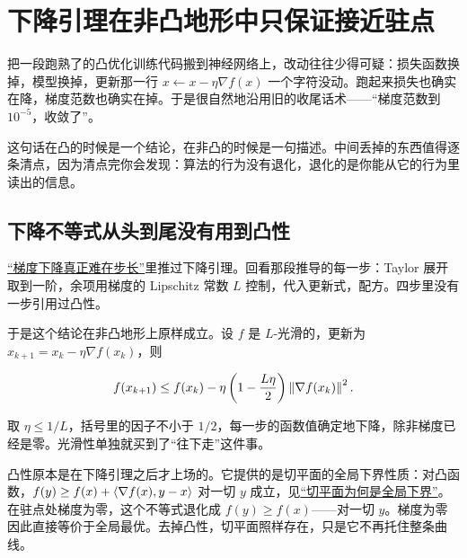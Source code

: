 \section{下降引理在非凸地形中只保证接近驻点}
\label{sec:09-Convex-Optimization/08-Nonconvex-and-Stochastic-Optimization/01}

把一段跑熟了的凸优化训练代码搬到神经网络上，改动往往少得可疑：损失函数换掉，模型换掉，更新那一行 \(x\leftarrow x-\eta\nabla f(x)\) 一个字符没动。跑起来损失也确实在降，梯度范数也确实在掉。于是很自然地沿用旧的收尾话术——``梯度范数到 \(10^{-5}\)，收敛了''。

这句话在凸的时候是一个结论，在非凸的时候是一句描述。中间丢掉的东西值得逐条清点，因为清点完你会发现：算法的行为没有退化，退化的是你能从它的行为里读出的信息。

\subsection{下降不等式从头到尾没有用到凸性}

\hyperref[sec:09-Convex-Optimization/06-Optimization-Algorithms/01]{``梯度下降真正难在步长''}里推过下降引理。回看那段推导的每一步：Taylor 展开取到一阶，余项用梯度的 Lipschitz 常数 \(L\) 控制，代入更新式，配方。四步里没有一步引用过凸性。

于是这个结论在非凸地形上原样成立。设 \(f\) 是 \(L\)-光滑的，更新为 \(x_{k+1}=x_k-\eta\nabla f(x_k)\)，则

\[
f(x_{k+1})\le f(x_k)-\eta\left(1-\frac{L\eta}{2}\right)\left\lVert\nabla f(x_k)\right\rVert^2 .
\]

取 \(\eta\le 1/L\)，括号里的因子不小于 \(1/2\)，每一步的函数值确定地下降，除非梯度已经是零。光滑性单独就买到了``往下走''这件事。

凸性原本是在下降引理之后才上场的。它提供的是切平面的全局下界性质：对凸函数，\(f(y)\ge f(x)+\left\langle\nabla f(x),y-x\right\rangle\) 对一切 \(y\) 成立，见\hyperref[sec:09-Convex-Optimization/03-Convex-Functions/02]{``切平面为何是全局下界''}。在驻点处梯度为零，这个不等式退化成 \(f(y)\ge f(x)\)——对一切 \(y\)。梯度为零因此直接等价于全局最优。去掉凸性，切平面照样存在，只是它不再托住整条曲线。

